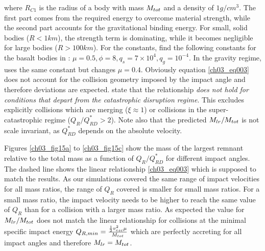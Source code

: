 where $R_{C1}$ is the radius of a body with mass $M_{tot}$ and a density of $1 g/cm^3$. The first part comes from the required energy to overcome material strength, while the second part accounts for the gravitational binding energy. For small, solid bodies ($R < 1km$), the strength term is dominating, while it becomes negligible for large bodies ($R > 100km$). For the constants, \cite{Stewart:2009p3265} find the following constants for the basalt bodies in \cite{Benz1999Icar..142....5B}: $\mu = 0.5, \phi = 8, q_s = 7 \times 10^4, q_g = 10^{-4}$. In the gravity regime, \cite{2010ApJ...712L..73M} uses the same constant but changes $\mu = 0.4$. Obviously equation \ref{ch03_eq003} does not account for the collision geometry imposed by the impact angle and therefore deviations are expected. \cite{Stewart:2009p3265} state that the relationship \emph{does not hold for conditions that depart from the catastrophic disruption regime}. This excludes explicitly collisions which are merging ($\xi \approx 1$) or collisions in the super-catastrophic regime ($Q_R / Q^*_{RD} > 2$). Note also that the predicted $M_{lr} / M_{tot}$ is not scale invariant, as $Q^*_{RD}$ depends on the absolute velocity.

Figures \ref{ch03_fig15a} to \ref{ch03_fig15c} show the mass of the largest remnant relative to the total mass as a function of $Q_R / Q^*_{RD}$ for different impact angles. The dashed line shows the linear relationship \ref{ch03_eq003} which is supposed to match the results. As our simulations covered the same range of impact velocities for all mass ratios, the range of $Q_R$ covered is smaller for small mass ratios. For a small mass ratio, the impact velocity needs to be higher to reach the same value of $Q_R$ than for a collision with a larger mass ratio. As expected the value for $M_{lr} / M_{tot}$ does not match the linear relationship for collisions at the minimal specific impact energy $Q_{R,min} = \frac{ \frac{1}{2} v_{esc}^2 \mu}{M_{tot}}$ which are perfectly accreting for all impact angles and therefore $M_{lr} = M_{tot}$. 


